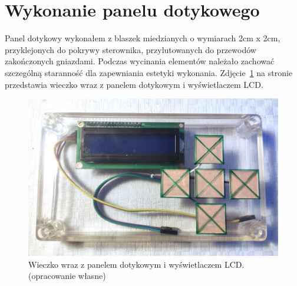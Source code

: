 \documentclass[11pt]{report}
\begin{document}
  \section{Wykonanie panelu dotykowego}
 Panel dotykowy wykonałem z blaszek miedzianych o wymiarach 2cm x 2cm, przyklejonych do pokrywy sterownika, przylutowanych do przewodów zakończonych gniazdami. Podczas wycinania elementów należało zachować szczególną staranność dla zapewniania estetyki wykonania.
  Zdjęcie~\ref{fig:wieczko} na stronie~\pageref{fig:wieczko} przedstawia wieczko wraz z panelem dotykowym i wyświetlaczem LCD.
\begin{figure}[ht]
\centering
\includegraphics[width=0.8 \textwidth]{fig/wieczko.jpg}
\caption{Wieczko wraz z panelem dotykowym i wyświetlaczem LCD. (opracowanie własne)}
\label{fig:wieczko}
\end{figure}
\end{document}

